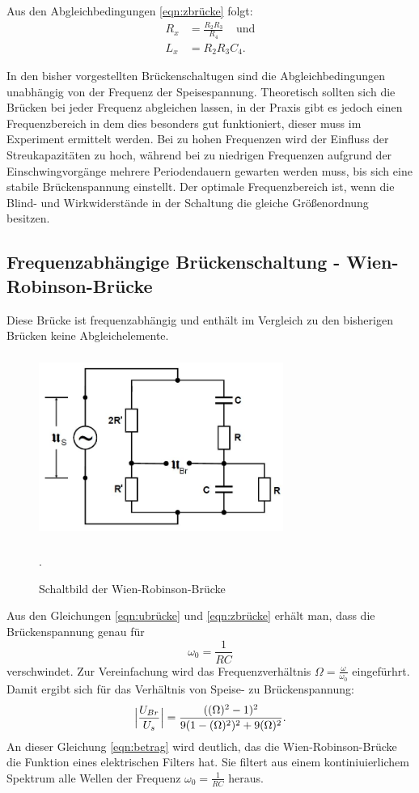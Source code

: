 \noindent Aus den Abgleichbedingungen \ref{eqn:zbrücke} folgt:
\begin{align}
  R_{x} &=\frac{R_{2} R_{3}}{R_{4}} \;\;\;\; \text{und} \\
  L_{x} &=R_{2}R_{3}C_{4}.
  \label{eqn:mx}
\end{align}

\noindent In den bisher vorgestellten Brückenschaltugen sind die Abgleichbedingungen
unabhängig von der Frequenz der Speisespannung. Theoretisch sollten sich die Brücken bei jeder
Frequenz abgleichen lassen, in der Praxis gibt es jedoch einen Frequenzbereich in dem
dies besonders gut funktioniert, dieser muss im Experiment ermittelt werden.
Bei zu hohen Frequenzen wird der Einfluss der Streukapazitäten zu hoch, während
bei zu niedrigen Frequenzen aufgrund der Einschwingvorgänge mehrere Periodendauern
gewarten werden muss, bis sich eine stabile Brückenspannung einstellt.
Der optimale Frequenzbereich ist, wenn die Blind- und Wirkwiderstände in der
Schaltung die gleiche Größenordnung besitzen.

\subsection{Frequenzabhängige Brückenschaltung - Wien-Robinson-Brücke}
Diese Brücke ist frequenzabhängig und enthält im Vergleich zu den bisherigen Brücken
keine Abgleichelemente.
\begin{figure}[H]
  \centering
  \includegraphics[width=8cm,height=6cm]{wien.JPG}
  \caption{Schaltbild der Wien-Robinson-Brücke}
  \label{fig:wien}
  \cite{skript}.
\end{figure}

\noindent Aus den Gleichungen \ref{eqn:ubrücke} und \ref{eqn:zbrücke} erhält man,
dass die Brückenspannung genau für
\begin{equation*}
  \omega_{0}=\frac{1}{RC}
  \label{eqn:omega}
\end{equation*}
verschwindet.
Zur Vereinfachung wird das Frequenzverhältnis $\Omega=\frac{\omega}{\omega_{0}}$
eingefürhrt. Damit ergibt sich für das Verhältnis von Speise- zu Brückenspannung:
\begin{equation}
  \Bigl|\frac{U_{Br}}{U_{s}}\Bigr|=\frac{((\Omega)^2-1)^2}{9(1-(\Omega)^2)^2+9(\Omega)^2}.
  \label{eqn:betrag}
\end{equation}
An dieser Gleichung \ref{eqn:betrag} wird deutlich, das die Wien-Robinson-Brücke
die Funktion eines elektrischen Filters hat. Sie filtert aus einem kontiniuierlichem
Spektrum alle Wellen der Frequenz $\omega_{0}=\frac{1}{RC}$ heraus.

